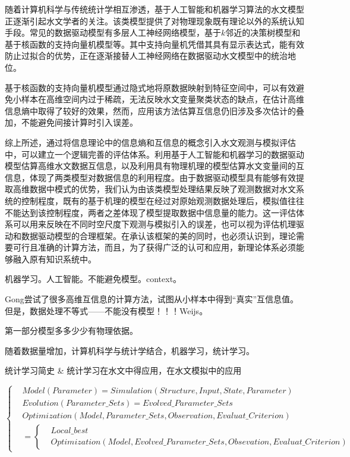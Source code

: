 随着计算机科学与传统统计学相互渗透，基于人工智能和机器学习算法的水文模型正逐渐引起水文学者的关注。该类模型提供了对物理现象既有理论以外的系统认知手段\cite{solomatine2008data}。常见的数据驱动模型有多层人工神经网络模型\cite{hsu1995artificial}，基于$k$邻近的决策树模型\cite{solomatine2008instance}和基于核函数的支持向量机模型\cite{dibike2001model,liong2002flood}等。其中支持向量机凭借其具有显示表达式，能有效防止过拟合的优势，正在逐渐接替人工神经网络在数据驱动水文模型中的统治地位。

基于核函数的支持向量机模型通过隐式地将原数据映射到特征空间中，可以有效避免小样本在高维空间内过于稀疏，无法反映水文变量聚类状态的缺点，在估计高维信息熵中取得了较好的效果\cite{phdgong}，然而，应用该方法估算互信息仍旧涉及多次估计的叠加，不能避免间接计算时引入误差。

综上所述，通过将信息理论中的信息熵和互信息的概念引入水文观测与模拟评估中，可以建立一个逻辑完善的评估体系。利用基于人工智能和机器学习的数据驱动模型估算高维水文数据互信息，以及利用具有物理机理的模型估算水文变量间的互信息，体现了两类模型对数据信息的利用程度。由于数据驱动模型具有能够有效提取高维数据中模式的优势，我们认为由该类模型处理结果反映了观测数据对水文系统的控制程度，既有的基于机理的模型在经过对原始观测数据处理后，模拟值往往不能达到该控制程度，两者之差体现了模型提取数据中信息量的能力。这一评估体系可以用来反映在不同时空尺度下观测与模拟引入的误差，也可以视为评估机理驱动和数据驱动模型的合理框架。在承认该框架的美的同时，也必须认识到，理论需要可行且准确的计算方法，而且，为了获得广泛的认可和应用，新理论体系必须能够融入原有知识系统中。

\iffalse
机器学习。人工智能。不能避免模型。context。


Gong尝试了很多高维互信息的计算方法，试图从小样本中得到``真实''互信息值。但是，数据处理不等式——不能没有模型！！！Weijs。

第一部分模型多多少少有物理依据。

随着数据量增加，计算机科学与统计学结合，机器学习，统计学习。

统计学习简史 \& 统计学习在水文中得应用，在水文模拟中的应用

\begin{equation*}
\left\{
\begin{aligned}
   &Model(Parameter)=Simulation(Structure,Input,State,Parameter)\\
   &Evolution(Parameter\_Sets)=Evolved\_Parameter\_Sets \\
   &Optimization (Model,Parameter\_Sets,Observation,Evaluat\_Criterion)\\&=\left\{\begin{aligned}&Local\_best\\&Optimization(Model,Evolved\_Parameter\_Sets,Obsevation,Evaluat\_Criterion)\end{aligned}\right.
\end{aligned}
\right.
\end{equation*}

